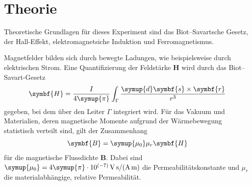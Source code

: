 \section{Theorie}
\label{sec:Theorie}
Theoretische Grundlagen für dieses Experiment sind das Biot--Savartsche Gesetz, der Hall-Effekt, elektromagnetsiche Induktion und Ferromagnetismus.

Magnetfelder bilden sich durch bewegte Ladungen, wie beispielsweise durch elektrischen Strom. %
Eine Quantifizierung der Feldstärke $\symbf{H}$ wird durch das Biot--Savart-Gesetz 
\begin{equation}
\symbf{H}=\frac{I}{4\symup{\pi}}\int_\Gamma \frac{\symup{d}\symbf{s}\times\symbf{r}}{r^3} %
\label{eqn:biotsavart}
\end{equation}
gegeben, bei dem über 
den Leiter $\Gamma$ integriert wird. %
Für das Vakuum und Materialien, deren magnetische Momente aufgrund der Wärmebewegung statistisch verteilt sind, gilt der %
Zusammenhang 
\begin{equation}
\symbf{B}=\symup{\mu_0}\mu_r\symbf{H}
\end{equation}
für die magnetische Flussdichte $\symbf{B}$. 
Dabei sind $\symup{\mu_0}=4\symup{\pi} \cdot 10^{(-7)} \, \si{\volt\second\ampere\tothe{-1}\meter\tothe{-1}}$ die Permeabilitätskonstante 
und $\mu_r$ die materialabhängige, relative Permeabilität. %

